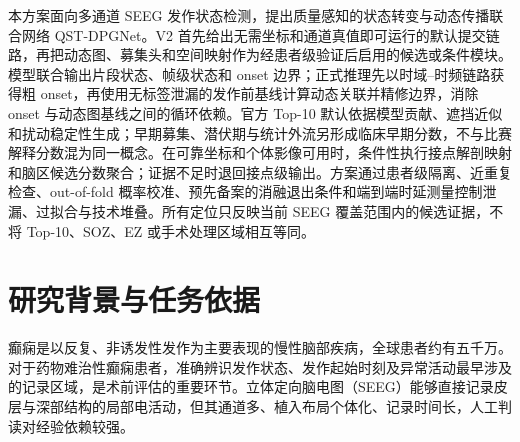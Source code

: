 \documentclass{cumcmthesis_v2}
\numberwithin{figure}{section} %
\numberwithin{table}{section} %
\begin{document}
	
\normalem

\maketitle
 
\newpage
\thispagestyle{empty}
\tableofcontents
\newpage
 
\thispagestyle{empty}
\listoffigures
\newpage

\thispagestyle{empty}
\listoftables
\newpage

\setcounter{page}{1}
 
\begin{cnabstract}

本方案面向多通道 SEEG 发作状态检测，提出质量感知的状态转变与动态传播联合网络 QST-DPGNet。V2 首先给出无需坐标和通道真值即可运行的默认提交链路，再把动态图、募集头和空间映射作为经患者级验证后启用的候选或条件模块。模型联合输出片段状态、帧级状态和 onset 边界；正式推理先以时域--时频链路获得粗 onset，再使用无标签泄漏的发作前基线计算动态关联并精修边界，消除 onset 与动态图基线之间的循环依赖。官方 Top-10 默认依据模型贡献、遮挡近似和扰动稳定性生成；早期募集、潜伏期与统计外流另形成临床早期分数，不与比赛解释分数混为同一概念。在可靠坐标和个体影像可用时，条件性执行接点解剖映射和脑区候选分数聚合；证据不足时退回接点级输出。方案通过患者级隔离、近重复检查、out-of-fold 概率校准、预先备案的消融退出条件和端到端时延测量控制泄漏、过拟合与技术堆叠。所有定位只反映当前 SEEG 覆盖范围内的候选证据，不将 Top-10、SOZ、EZ 或手术处理区域相互等同。

	
\end{cnabstract}


\section*{研究背景与任务依据}

癫痫是以反复、非诱发性发作为主要表现的慢性脑部疾病，全球患者约有五千万\cite{who_epilepsy}。对于药物难治性癫痫患者，准确辨识发作状态、发作起始时刻及异常活动最早涉及的记录区域，是术前评估的重要环节\cite{kwan_dre,rosenow_ez}。立体定向脑电图（SEEG）能够直接记录皮层与深部结构的局部电活动，但其通道多、植入布局个体化、记录时间长，人工判读对经验依赖较强\cite{alomar_seeg}。
\end{document}
